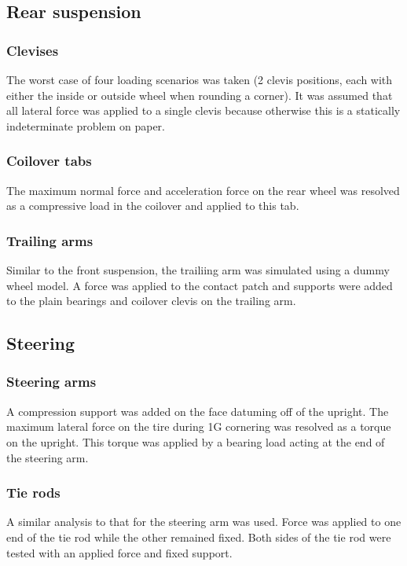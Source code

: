 \documentclass[10pt]{article}
\begin{document}
\subsection{Rear suspension}
\subsubsection{Clevises}
The worst case of four loading scenarios was taken (2 clevis positions, each with either the inside or outside wheel when rounding a corner). It was assumed that all lateral force was applied to a single clevis because otherwise this is a statically indeterminate problem on paper.

\subsubsection{Coilover tabs}
The maximum normal force and acceleration force on the rear wheel was resolved as a compressive load in the coilover and applied to this tab.

\subsubsection{Trailing arms}
Similar to the front suspension, the trailiing arm was simulated using a dummy wheel model. A force was applied to the contact patch and supports were added to the plain bearings and coilover clevis on the trailing arm.

\subsection{Steering}
\subsubsection{Steering arms}
A compression support was added on the face datuming off of the upright. The maximum lateral force on the tire during 1G cornering was resolved as a torque on the upright. This torque was applied by a bearing load acting at the end of the steering arm.

\subsubsection{Tie rods}
A similar analysis to that for the steering arm was used. Force was applied to one end of the tie rod while the other remained fixed. Both sides of the tie rod were tested with an applied force and fixed support.
\end{document}
